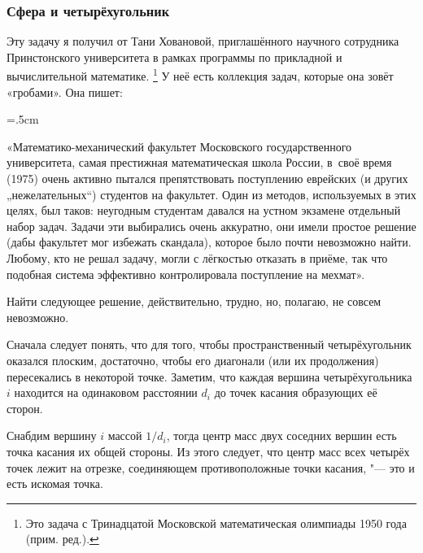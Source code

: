 \documentclass[twoside]{book}
\begin{document}
\subsubsection*{Сфера и четырёхугольник}%

Эту задачу я получил от Тани Ховановой, приглашённого научного сотрудника Принстонского университета в рамках программы по прикладной и вычислительной математике.%
\footnote{Это задача с Тринадцатой Московской математическая олимпиады 1950 года
\cite[13.17]{МосковскиеМО} (прим. ред.).}
У неё есть коллекция задач, которые она зовёт «гробами».
Она пишет:

\medskip

\begin{trivlist}\leftskip=5mm\rightskip=.5cm
  \small
\item\relax«Математико-механический факультет Московского государственного университета, самая престижная математическая школа России, в~своё время (1975) очень активно пытался препятствовать поступлению еврейских (и других „нежелательных“) студентов на факультет.
Один из методов, используемых в этих целях, был таков: неугодным студентам давался на устном экзамене отдельный набор задач.
Задачи эти выбирались очень аккуратно, они имели простое решение (дабы факультет мог избежать скандала), которое было почти невозможно найти.
Любому, кто не решал задачу, могли с лёгкостью отказать в приёме, так что подобная система эффективно контролировала поступление на мехмат». 
\end{trivlist}

\medskip

Найти следующее решение, действительно, трудно, но, полагаю, не совсем невозможно.


Сначала следует понять, что для того, чтобы пространственный четырёхугольник оказался плоским, достаточно, чтобы его диагонали (или их продолжения) пересекались в некоторой точке.
Заметим, что каждая вершина четырёхугольника $i$ находится на одинаковом расстоянии $d_i$ до точек касания образующих её сторон.

Снабдим вершину $i$ массой $1/d_i$, тогда центр масс двух соседних вершин есть точка касания их общей стороны. 
Из этого следует, что центр масс всех четырёх точек лежит на отрезке, соединяющем противоположные точки касания, "--- это и есть искомая точка.
\heart
\end{document}
